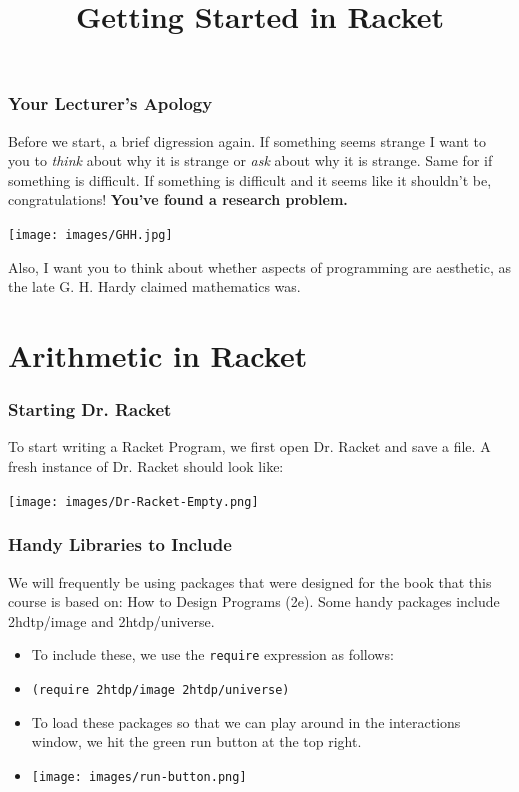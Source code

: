 \documentclass{beamer}
\title{Getting Started in Racket}
\begin{document}
\begin{frame}
\titlepage
\end{frame}

\begin{frame}
  \frametitle{Your Lecturer's Apology}
  Before we start, a brief digression again. If something seems
  strange I want to you to \emph{think} about why it is strange
  or \emph{ask} about why it is strange. Same for if something is difficult.
  If something is difficult and it seems like it shouldn't be, congratulations!
  \textbf{You've found a research problem.}
  \begin{center}
    \texttt{[image: images/GHH.jpg]}
  \end{center}
  Also, I want you to think about whether aspects of programming are
  aesthetic, as the late G. H. Hardy claimed mathematics was.  
\end{frame}

\section{Arithmetic in Racket}
\begin{frame}
  \frametitle{Starting Dr. Racket}
  To start writing a Racket Program, we first open Dr. Racket and save a file.
  A fresh instance of Dr. Racket should look like:\\
  \pause
  \begin{center}
    \texttt{[image: images/Dr-Racket-Empty.png]}
  \end{center}

\end{frame}

\begin{frame}
  \frametitle{Handy Libraries to Include}
  We will frequently be using packages that were designed for the book that this course is based on: How to Design Programs (2e). Some
  handy packages include 2hdtp/image and 2htdp/universe.
  \begin{itemize}
  \item<2-> To include these, we use the \texttt{require} expression as follows:
  \item<3-> \texttt{(require 2htdp/image 2htdp/universe)}
  \item<4-> To load these packages so that we can play around in the interactions window, we hit the green run button at the top right.
  \item<5-> \texttt{[image: images/run-button.png]}
  \end{itemize}
\end{frame}
\end{document}
